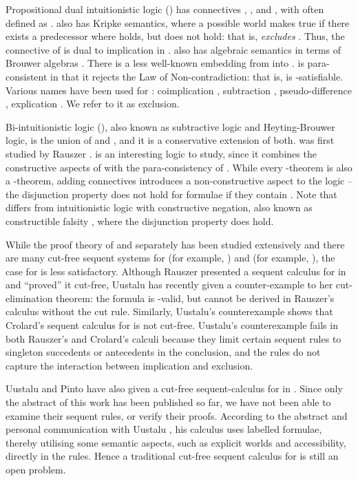 \documentclass{llncs}
\numberwithin{equation}{section}
\begin{document}
Propositional dual intuitionistic logic () has connectives , ,  and , with  often defined as .  also has Kripke semantics, where a possible world  makes  true if there exists a predecessor  where  holds, but  does not hold: that is,  \textit{excludes} . Thus, the  connective of  is dual to implication in .  also has algebraic semantics in terms of Brouwer algebras \cite{mckinsey1946}. There is a less well-known embedding from  into .  is para-consistent in that it rejects the Law of Non-contradiction: that is,  is -satisfiable. Various names have been used for : coimplication \cite{wolter98,uustalu2006a}, subtraction \cite{crolard2001,crolard2004}, pseudo-difference \cite{rauszer1980}, explication \cite{rauszer1974}. We refer to it as exclusion.

Bi-intuitionistic logic (), also known as subtractive logic and Heyting-Brouwer logic, is the union of  and , and it is a conservative extension of both.  was first studied by Rauszer \cite{rauszer1974,rauszer1980}.
 is an interesting logic to study, since it combines the constructive aspects of  with the para-consistency of .
While every -theorem is also a -theorem, adding  connectives introduces a non-constructive aspect to the logic -- the disjunction property does not hold for  formulae if they contain . Note that  differs from intuitionistic logic with constructive negation, also known as constructible falsity \cite{nelson1949}, where the disjunction property does hold.

While the proof theory of  and  separately has been studied extensively and there are many cut-free sequent systems for  (for example, \cite{gentzen1935,dyckhoff1992,dragalin1988}) and  (for example, \cite{urbas1996,czermak1977}), the case for  is less satisfactory. Although Rauszer presented a sequent calculus for  in \cite{rauszer1974} and ``proved'' it cut-free, Uustalu has recently given a counter-example \cite{uustalu2004} to her cut-elimination theorem: the formula  is -valid, but cannot be derived in Rauszer's calculus without the cut rule. Similarly, Uustalu's counterexample shows that Crolard's sequent calculus \cite{crolard2001} for  is not cut-free. Uustalu's counterexample fails in both Rauszer's and Crolard's calculi because they limit certain sequent rules to singleton succedents or antecedents in the conclusion, and the rules do not capture the interaction between implication and exclusion.

Uustalu and Pinto have also given a cut-free sequent-calculus for  in \cite{uustalu2006a}. Since only the abstract of this work has been published so far, we have not been able to examine their sequent rules, or verify their proofs. According to the abstract \cite{uustalu2006a} and personal communication with Uustalu \cite{uustalu2006}, his calculus uses labelled formulae, thereby utilising some semantic aspects, such as explicit worlds and accessibility, directly in the rules. Hence a traditional cut-free sequent calculus for  is still an open problem.
\end{document}
